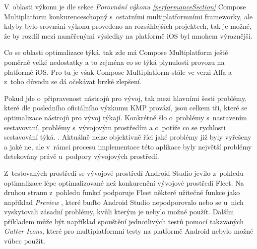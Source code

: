 V~oblasti výkonu je dle sekce \textit{Porovnání výkonu \ref{performanceSection}} Compose Multiplatform konkurenceschopný s~ostatními 
multiplatformními frameworky, ale kdyby bylo srovnání výkonu provedeno na rozsáhlejších projektech, tak je možné, že by rozdíl mezi 
naměřenými výsledky na platformě iOS byl mnohem výraznější.

Co se oblasti optimalizace týká, tak zde má Compose Multiplatform ještě poměrně velké nedostatky a to zejména co se týká plynulosti
provozu na platformě iOS. Pro tu je však Compose Multiplatform stále ve verzi Alfa a z~toho důvodu se dá očekávat brzké zlepšení. \cite{KMPRoaddMap}

Pokud jde o~připravenost nástrojů pro vývoj, tak mezi hlavními šesti problémy, které dle posledního oficiálního výzkumu KMP
provází, jsou celkem tři, které se optimalizace nástrojů pro vývoj týkají. Konkrétně šlo o~problémy s~nastavením sestavovaní, problémy
s~vývojovým prostředím a o~potíže co se rychlosti sestavování týká. \cite{imgSurvey}. Aktuálně nelze objektivně říci jaké problémy již byly 
vyřešeny a jaké ne, ale v~rámci procesu implementace této aplikace byly největší problémy detekovány právě u~podpory vývojových prostředí.

Z~testovaných prostředí se vývojové prostředí Android Studio jevilo z~pohledu optimalizace lépe optimalizované než konkurenční vývojové 
prostředí Fleet. Na druhou stranu z~pohledu funkcí podporuje Fleet některé užitečné funkce jako například \textit{Preview} \cite{previewCompose}, které buďto
Android Studio nepodporovalo nebo se u~nich vyskytovali zásadní problémy, kvůli kterým je nebylo možné použít. Dalším příkladem může být 
například spouštění jednotlivých testů pomocí takzvaných \textit{Gutter Icons}, které pro multiplatformní testy na platformě Android nebylo možné vůbec použít. \cite{gutter}



